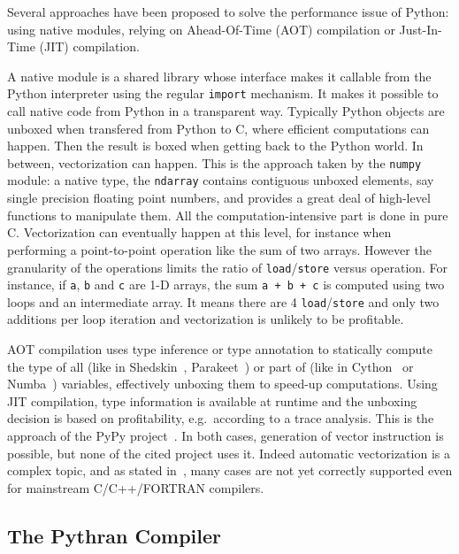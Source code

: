 \documentclass[preprint]{sigplanconf}
\begin{document}
Several approaches have been proposed to solve the performance issue of Python:
using native modules, relying on Ahead-Of-Time (AOT) compilation or
Just-In-Time (JIT) compilation.

A native module is a shared library whose interface makes it callable from the
Python interpreter using the regular \texttt{import} mechanism. It makes it
possible to call native code from Python in a transparent way. Typically Python
objects are unboxed when transfered from Python to C, where efficient
computations can happen. Then the result is boxed when getting back to the
Python world. In between, vectorization can happen. This is the approach taken
by the \texttt{numpy} module: a native type, the \texttt{ndarray} contains
contiguous unboxed elements, say single precision floating point numbers, and
provides a great deal of high-level functions to manipulate them. All the
computation-intensive part is done in pure C.  Vectorization can eventually
happen at this level, for instance when performing a point-to-point operation
like the sum of two arrays. However the granularity of the operations limits
the ratio of \texttt{load}/\texttt{store} versus operation. For instance, if
\texttt{a}, \texttt{b} and \texttt{c} are 1-D arrays, the sum \texttt{a + b +
c} is computed using two loops and an intermediate array. It means there are 4
\texttt{load}/\texttt{store} and only two additions per loop iteration and vectorization is
unlikely to be profitable.

AOT compilation uses type inference or type annotation to statically compute
the type of all (like in Shedskin~\cite{shedskin2006},
Parakeet~\cite{parakeet2012}) or part of (like in Cython~\cite{cython2010} or
Numba~\cite{numba}) variables, effectively unboxing them to speed-up
computations. Using JIT compilation, type information is available at runtime
and the unboxing decision is based on profitability, e.g.\ according to a trace
analysis. This is the approach of the PyPy project~\cite{pypy2009}. In both
cases, generation of vector instruction is possible, but none of the cited
project uses it. Indeed automatic vectorization is a complex topic, and as
stated in~\cite{maleki2011}, many cases are not yet correctly supported even
for mainstream C/C++/FORTRAN compilers.

\subsection{The Pythran Compiler}
\end{document}
